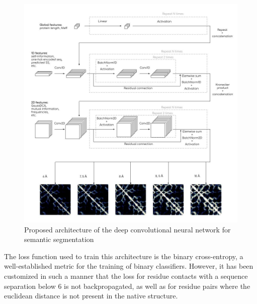   \begin{figure}[H]
    \begin{center}
      \includegraphics[width=\textwidth, keepaspectratio]{imgs/architecture.jpg}
       \caption{Proposed architecture of the deep convolutional neural network for semantic segmentation}
      \label{architecture}
    \end{center}
  \end{figure}

  The loss function used to train this architecture is the binary cross-entropy, a well-established
  metric for the training of binary classifiers. However, it has been customized in such a manner
  that the loss for residue contacts with a sequence separation below 6 is not backpropagated,
  as well as for residue pairs where the euclidean distance is not present in the native structure.

